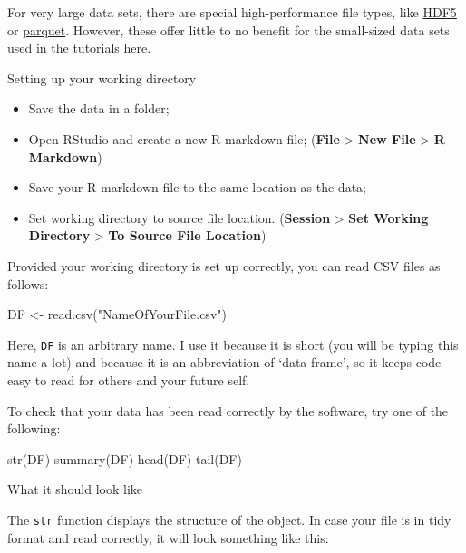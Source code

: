 \documentclass[
]{book}
\newenvironment{Shaded}{\begin{snugshade}}{\end{snugshade}}
\newcommand{\FunctionTok}[1]{\textcolor[rgb]{0.00,0.00,0.00}{#1}}
\newcommand{\NormalTok}[1]{#1}
\newcommand{\OtherTok}[1]{\textcolor[rgb]{0.56,0.35,0.01}{#1}}
\newcommand{\StringTok}[1]{\textcolor[rgb]{0.31,0.60,0.02}{#1}}
\providecommand{\tightlist}{%
  \setlength{\itemsep}{0pt}\setlength{\parskip}{0pt}}
\begin{document}
For very large data sets, there are special high-performance file types, like \href{https://en.wikipedia.org/wiki/Hierarchical_Data_Format\#HDF5}{HDF5} or \href{https://en.wikipedia.org/wiki/Apache_Parquet}{parquet}. However, these offer little to no benefit for the small-sized data sets used in the tutorials here.

Setting up your working directory

\begin{itemize}
\tightlist
\item
  Save the data in a folder;
\item
  Open RStudio and create a new R markdown file; (\textbf{File} \textgreater{} \textbf{New File} \textgreater{} \textbf{R Markdown})
\item
  Save your R markdown file to the same location as the data;
\item
  Set working directory to source file location. (\textbf{Session} \textgreater{} \textbf{Set Working Directory} \textgreater{} \textbf{To Source File Location})
\end{itemize}

Provided your working directory is set up correctly, you can read CSV files as follows:

\begin{Shaded}
\begin{Highlighting}[]
\NormalTok{DF }\OtherTok{\textless{}{-}} \FunctionTok{read.csv}\NormalTok{(}\StringTok{"NameOfYourFile.csv"}\NormalTok{)}
\end{Highlighting}
\end{Shaded}

Here, \texttt{DF} is an arbitrary name. I use it because it is short (you will be typing this name a lot) and because it is an abbreviation of `data frame', so it keeps code easy to read for others and your future self.

To check that your data has been read correctly by the software, try one of the following:

\begin{Shaded}
\begin{Highlighting}[]
\FunctionTok{str}\NormalTok{(DF)}
\FunctionTok{summary}\NormalTok{(DF)}
\FunctionTok{head}\NormalTok{(DF)}
\FunctionTok{tail}\NormalTok{(DF)}
\end{Highlighting}
\end{Shaded}

What it should look like

The \texttt{str} function displays the structure of the object. In case your file is in tidy format and read correctly, it will look something like this:
\end{document}
